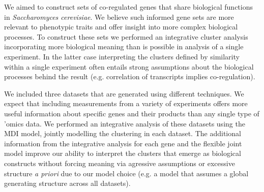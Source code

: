 \documentclass[]{article}
\begin{document}
We aimed to construct sets of co-regulated genes that share biological functions in \emph{Saccharomyces cerevisiae}. We believe such informed gene sets are more relevant to phenotypic traits and offer insight into more complex biological processes. To construct these sets we performed an integrative cluster analysis incorporating more biological meaning than is possible in analysis of a single experiment. In the latter case interpreting the clusters defined by similarity within a single experiment often entails strong assumptions about the biological processes behind the result (e.g. correlation of transcripts implies co-regulation).

We included three datasets that are generated using different techniques. We expect that including measurements from a variety of experiments offers more useful information about specific genes and their products than any single type of 'omics data. We performed an integrative analysis of these datasets using the MDI model, jointly modelling the clustering in each dataset. The additional information from the integrative analysis for each gene and the flexible joint model improve our ability to interpret the clusters that emerge as biological constructs without forcing meaning via agressive assumptions or excessive structure \emph{a priori} due to our model choice (e.g. a model that assumes a global generating structure across all datasets).

\end{document}
